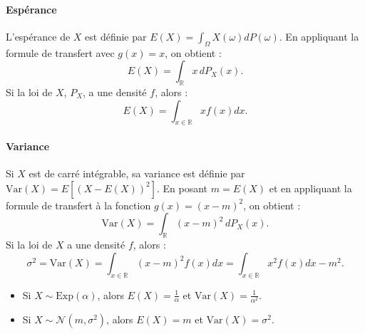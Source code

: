 \paragraph{Espérance}
L'espérance de $X$ est définie par $E(X) = \int_{\Omega} X(\omega) dP(\omega)$. En appliquant la formule de transfert avec $g(x) = x$, on obtient :
\[
E(X) = \int_{\mathbb{R}} x \,dP_X(x).
\]
Si la loi de $X$, $P_X$, a une densité $f$, alors :
\[
E(X) = \int_{x \in \mathbb{R}} x f(x) dx.
\]
\paragraph{Variance}
Si $X$ est de carré intégrable, sa variance est définie par $\text{Var}(X) = E[(X-E(X))^2]$. En posant $m=E(X)$ et en appliquant la formule de transfert à la fonction $g(x) = (x-m)^2$, on obtient :
\[
\text{Var}(X) = \int_{\mathbb{R}} (x-m)^2 \,dP_X(x).
\]
Si la loi de $X$ a une densité $f$, alors :
\[
\sigma^2 = \text{Var}(X) = \int_{x \in \mathbb{R}} (x-m)^2 f(x) dx = \int_{x \in \mathbb{R}} x^2 f(x) dx - m^2.
\]
\begin{example}
\begin{itemize}
    \item Si $X \sim \text{Exp}(\alpha)$, alors $E(X) = \frac{1}{\alpha}$ et $\text{Var}(X) = \frac{1}{\alpha^2}$.
    \item Si $X \sim \mathcal{N}(m, \sigma^2)$, alors $E(X) = m$ et $\text{Var}(X) = \sigma^2$.
\end{itemize}
\end{example}

